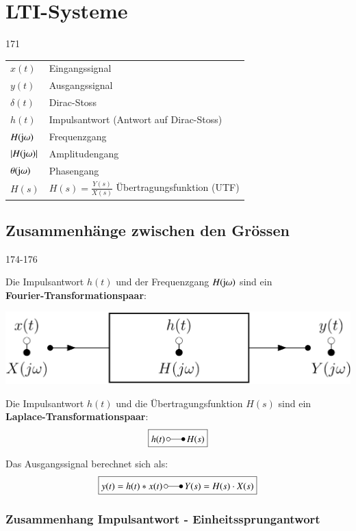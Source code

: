 \section{LTI-Systeme}{171}

\begin{tabular}{ll}
    $x(t)$                  & Eingangssignal \\
    $y(t)$                  & Ausgangssignal \\
    $\delta(t)$             & Dirac-Stoss \\
    $h(t)$                  & Impulsantwort (Antwort auf Dirac-Stoss) \\
    $H(\mathrm{j} \omega)$       & Frequenzgang \\
    $|H(\mathrm{j} \omega)|$     & Amplitudengang \\
    $\theta(\mathrm{j} \omega)$  & Phasengang \\
    $H(s)$                  & $H(s) = \frac{Y(s)}{X(s)}$ Übertragungsfunktion (UTF)
\end{tabular}


\subsection{Zusammenhänge zwischen den Grössen}{174-176}
\label{Zusammenhang}

Die Impulsantwort $h(t)$ und der Frequenzgang $H(\mathrm{j} \omega)$ sind ein \\
\textbf{Fourier-Transformationspaar}:

\begin{center}
    \includegraphics[width=0.7\columnwidth]{images/frequenzgang_impulsantwort.png} \\
\end{center}

Die Impulsantwort $h(t)$ und die Übertragungsfunktion $H(s)$ sind ein\\
\textbf{Laplace-Transformationspaar}:
$$ \boxed{ h(t) \, \laplace \, H(s) } $$

Das Ausgangssignal berechnet sich als: 
$$ \boxed{ y(t) = h(t) * x(t) \, \laplace \, Y(s) = H(s) \cdot X(s) } $$


\subsubsection{Zusammenhang Impulsantwort - Einheitssprungantwort}

